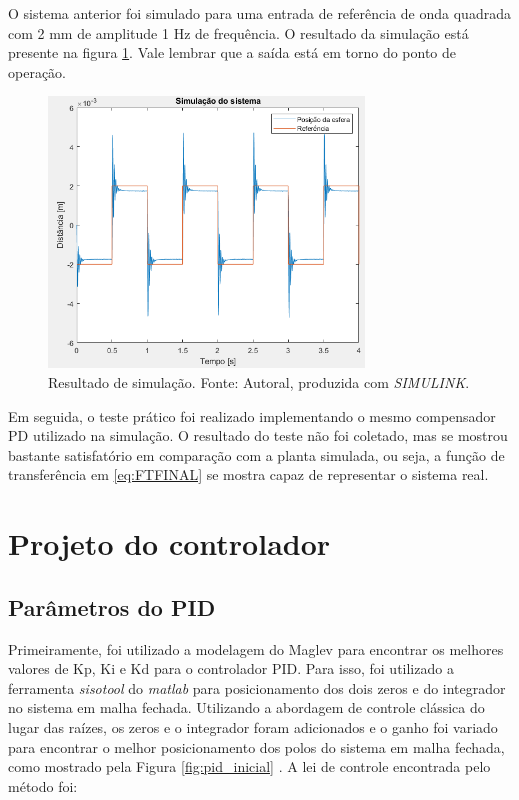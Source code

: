 \documentclass{ifacconf}
\begin{document}
O sistema anterior foi simulado para uma entrada de referência de onda quadrada com 2 mm de amplitude 1 Hz de frequência. O resultado da simulação está presente na figura \ref{fig:simvalidacao}.
Vale lembrar que a saída está em torno do ponto de operação.
\begin{figure}[!htb]
  \begin{center}
  \includegraphics[width=8.4cm]{figures/SimPDvalidacao.png}    %
  \caption{Resultado de simulação. Fonte: Autoral, produzida com \textit{SIMULINK}.} 
  \label{fig:simvalidacao}
  \end{center}
\end{figure}

Em seguida, o teste prático foi realizado implementando o mesmo compensador PD utilizado na simulação. O resultado do teste não foi coletado, mas se
mostrou bastante satisfatório em comparação com a planta simulada, ou seja, a função de transferência em \ref{eq:FTFINAL} se mostra capaz de representar
o sistema real.

\section{Projeto do controlador}
 
\subsection{Parâmetros do PID}
Primeiramente, foi utilizado a modelagem do Maglev para encontrar os melhores valores de Kp, Ki e Kd para o controlador PID.
Para isso, foi utilizado a ferramenta \textit{sisotool} do \textit{matlab} para posicionamento dos dois zeros e do integrador no sistema em malha fechada.
Utilizando a abordagem de controle clássica do lugar das raízes, os zeros e o integrador foram adicionados e o ganho foi variado para encontrar o melhor posicionamento 
dos polos do sistema em malha fechada, como mostrado pela Figura \ref{fig:pid_inicial} . A lei de controle encontrada pelo método foi:
\end{document}

